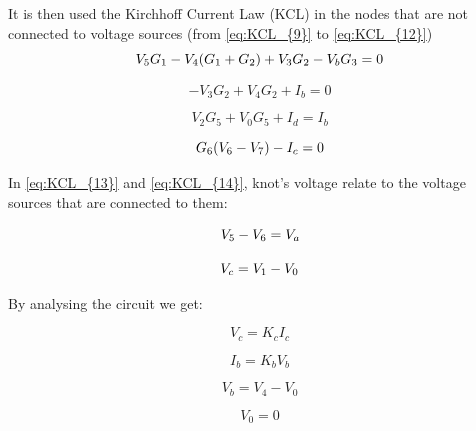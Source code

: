 It is then used the Kirchhoff Current Law (KCL) in the nodes that are not connected to voltage sources (from \ref{eq:KCL_{9}} to \ref{eq:KCL_{12}})
\vspace{0.1cm}
\begin{equation}
    V_{5} G_{1} - V_{4} (G_{1} + G_{2}) + V_{3} G_{2} - V_{b} G_{3} = 0
    \label{eq:KCL_{9}}
\end{equation}

\begin{equation}
    -V_{3} G_{2} + V_{4} G_{2} + I_{b} = 0
\end{equation}

\begin{equation}
    V_{2} G_{5} + V_{0} G_{5} + I_{d} = I_{b}
\end{equation}

\begin{equation}
    G_{6} (V_{6} - V_{7}) - I_{c} = 0
    \label{eq:KCL_{12}}
\end{equation}
\vspace{0.5cm}

\pagebreak


In \ref{eq:KCL_{13}} and \ref{eq:KCL_{14}}, knot's voltage relate to the voltage sources that are connected to them:



\begin{equation}
    V_{5} - V_{6} = V_{a}
    \label{eq:KCL_{13}}
\end{equation}

\begin{equation}
    V_{c} = V_{1} - V_{0}
    \label{eq:KCL_{14}}
\end{equation}



\vspace{0.5cm}

By analysing the circuit we get:

\vspace{0.5cm}
\begin{equation}
    V_{c} = K_{c} I_{c}
\end{equation}

\begin{equation}
    I_{b} = K_{b} V_{b}
\end{equation}

\begin{equation}
    V_{b} = V_{4} - V_{0}
\end{equation}

\begin{equation}
    V_{0} = 0
\end{equation}


